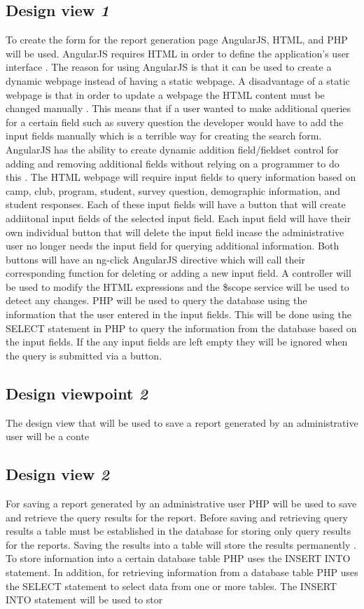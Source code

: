\documentclass[letterpaper,10pt,serif, draftclsnofoot,onecolumn, compsoc, titlepage]{IEEEtran}
\begin{document}
\subsection{Design view \emph{1}}
To create the form for the report generation page AngularJS, HTML, and PHP will be used. 
AngularJS requires HTML in order to define the application's user interface \cite{Lau}. 
The reason for using AngularJS is that it can be used to create a dynamic webpage instead of having a static webpage.
A disadvantage of a static webpage is that in order to update a webpage the HTML content must be changed manually \cite{Webpage}. 
This means that if a user wanted to make additional queries for a certain field such as suvery question the developer would have to add the input fields manually which is a terrible way for creating the search form.
AngularJS has the ability to create dynamic addition field/fieldset control for adding and removing additional fields without relying on a programmer to do this \cite{AddField}. 
The HTML webpage will require input fields to query information based on camp, club, program, student, survey question, demographic information, and student responses. 
Each of these input fields will have a button that will create addiitonal input fields of the selected input field. 
Each input field will have their own individual button that will delete the input field incase the administrative user no longer needs the input field for querying additional information. 
Both buttons will have an ng-click AngularJS directive which will call their corresponding function for deleting or adding a new input field. A controller will be used to modify the HTML expressions and the \$scope service will be used to detect any changes\cite{Rav}. 
PHP will be used to query the database using the information that the user entered in the input fields. 
This will be done using the SELECT statement in PHP to query the information from the database based on the input fields. If the any input fields are left empty they will be ignored when the query is submitted via a button. 

\subsection{Design viewpoint \emph{2}}
 The design view that will be used to save a report generated by an administrative user will be a conte
\subsection{Design view \emph{2}}
For saving a report generated by an administrative user PHP will be used to save and retrieve the query results for the report.
Before saving and retrieving query results a table must be established in the database for storing only query results for the reports. 
Saving the results into a table will store the results permanently \cite{Microsoft}. 
To store information into a certain database table PHP uses the INSERT INTO statement. In addition, for retrieving information from a database table PHP uses the SELECT statement to select data from one or more tables. 
The INSERT INTO statement will be used to stor
\end{document}
